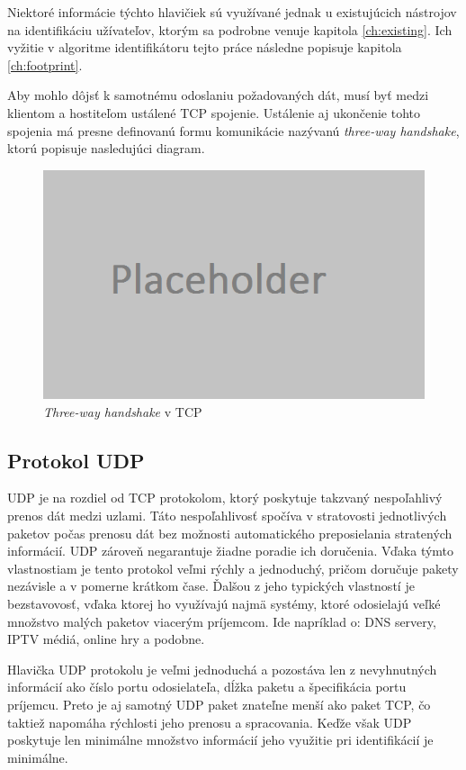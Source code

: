\documentclass[
  printed, %
  table,   %
  lof,     %
  lot,     %
]{fithesis3}
\begin{document}
Niektoré informácie týchto hlavičiek sú využívané jednak u existujúcich
nástrojov na identifikáciu užívateľov, ktorým sa podrobne venuje kapitola
\ref{ch:existing}. Ich vyžitie v algoritme identifikátoru tejto práce následne
popisuje kapitola \ref{ch:footprint}.

Aby mohlo dôjsť k samotnému odoslaniu požadovaných dát, musí byť medzi klientom
a hostiteľom ustálené TCP spojenie. Ustálenie aj ukončenie tohto spojenia má
presne definovanú formu komunikácie nazývanú \textit{three-way handshake}, ktorú
popisuje nasledujúci diagram.

\begin{figure}[h]
  \centering
    \includegraphics[width=.80\textwidth]{images/net-tcp-flow.png}
  \caption{\textit{Three-way handshake} v TCP}
  \label{fig:net-tcp-flow}
\end{figure}

\subsection{Protokol UDP}
UDP je na rozdiel od TCP protokolom, ktorý poskytuje takzvaný nespoľahlivý
prenos dát medzi uzlami. Táto nespoľahlivosť spočíva v stratovosti jednotlivých
paketov počas prenosu dát bez možnosti automatického preposielania stratených
informácií. UDP zároveň negarantuje žiadne poradie ich doručenia. Vďaka týmto
vlastnostiam je tento protokol veľmi rýchly a jednoduchý, pričom doručuje
pakety nezávisle a v pomerne krátkom čase. Ďalšou z jeho typických vlastností
je bezstavovosť, vďaka ktorej ho využívajú najmä systémy, ktoré odosielajú
veľké množstvo malých paketov viacerým príjemcom. Ide napríklad o: DNS servery,
IPTV médiá, online hry a podobne.

Hlavička UDP protokolu je veľmi jednoduchá a pozostáva len z nevyhnutných
informácií ako číslo portu odosielateľa, dĺžka paketu a špecifikácia portu
príjemcu. Preto je aj samotný UDP paket znateľne menší ako paket TCP, čo
taktiež napomáha rýchlosti jeho prenosu a spracovania. Keďže však UDP poskytuje
len minimálne množstvo informácií jeho využitie pri identifikácií je minimálne.
\end{document}
